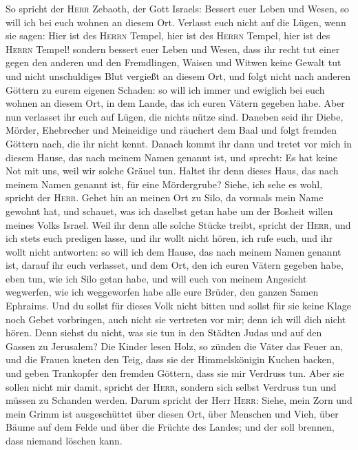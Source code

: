  So spricht der \textsc{Herr} Zebaoth, der Gott Israels:
Bessert euer Leben und Wesen, so will ich bei euch wohnen an diesem Ort.
 Verlasst euch nicht auf die Lügen, wenn sie sagen: Hier
ist des \textsc{Herrn} Tempel, hier ist des \textsc{Herrn} Tempel, hier
ist des \textsc{Herrn} Tempel!  sondern bessert euer Leben
und Wesen, dass ihr recht tut einer gegen den anderen  und
den Fremdlingen, Waisen und Witwen keine Gewalt tut und nicht
unschuldiges Blut vergießt an diesem Ort, und folgt nicht nach anderen
Göttern zu eurem eigenen Schaden:  so will ich immer und
ewiglich bei euch wohnen an diesem Ort, in dem Lande, das ich euren
Vätern gegeben habe.  Aber nun verlasset ihr euch auf
Lügen, die nichts nütze sind.  Daneben seid ihr Diebe,
Mörder, Ehebrecher und Meineidige und räuchert dem Baal und folgt
fremden Göttern nach, die ihr nicht kennt.  Danach kommt
ihr dann und tretet vor mich in diesem Hause, das nach meinem Namen
genannt ist, und sprecht: Es hat keine Not mit uns, weil wir solche
Gräuel tun.  Haltet ihr denn dieses Haus, das nach meinem
Namen genannt ist, für eine Mördergrube? Siehe, ich sehe es wohl,
spricht der \textsc{Herr}.  Gehet hin an meinen Ort zu
Silo, da vormals mein Name gewohnt hat, und schauet, was ich daselbst
getan habe um der Bosheit willen meines Volks Israel. 
Weil ihr denn alle solche Stücke treibt, spricht der \textsc{Herr}, und
ich stets euch predigen lasse, und ihr wollt nicht hören, ich rufe euch,
und ihr wollt nicht antworten:  so will ich dem Hause,
das nach meinem Namen genannt ist, darauf ihr euch verlasset, und dem
Ort, den ich euren Vätern gegeben habe, eben tun, wie ich Silo getan
habe,  und will euch von meinem Angesicht wegwerfen, wie
ich weggeworfen habe alle eure Brüder, den ganzen Samen Ephraims.
 Und du sollst für dieses Volk nicht bitten und sollst
für sie keine Klage noch Gebet vorbringen, auch nicht sie vertreten vor
mir; denn ich will dich nicht hören.  Denn siehst du
nicht, was sie tun in den Städten Judas und auf den Gassen zu Jerusalem?
 Die Kinder lesen Holz, so zünden die Väter das Feuer an,
und die Frauen kneten den Teig, dass sie der Himmelskönigin Kuchen
backen, und geben Trankopfer den fremden Göttern, dass sie mir Verdruss
tun.  Aber sie sollen nicht mir damit, spricht der
\textsc{Herr}, sondern sich selbst Verdruss tun und müssen zu Schanden
werden.  Darum spricht der Herr \textsc{Herr}: Siehe,
mein Zorn und mein Grimm ist ausgeschüttet über diesen Ort, über
Menschen und Vieh, über Bäume auf dem Felde und über die Früchte des
Landes; und der soll brennen, dass niemand löschen kann.

